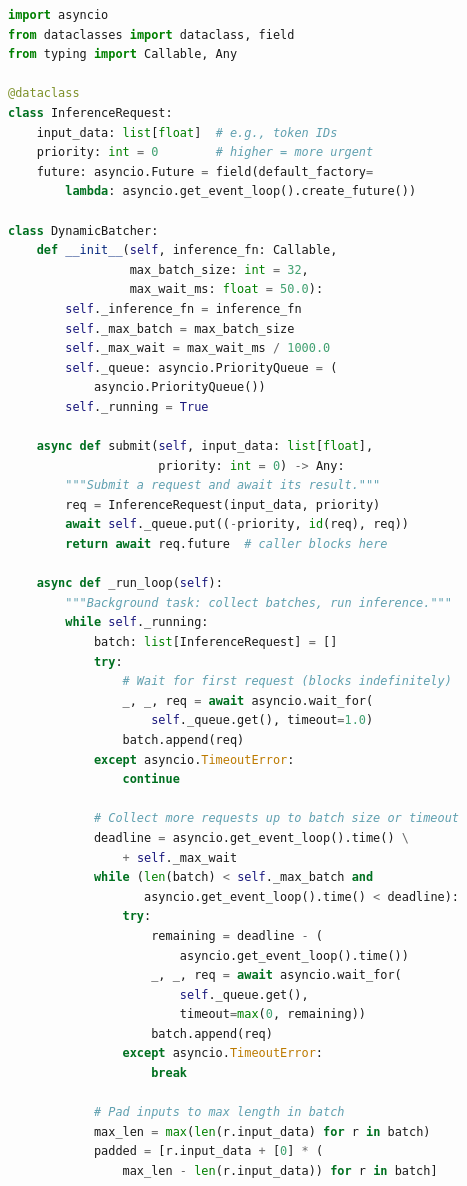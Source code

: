 \begin{lstlisting}[language=Python]
import asyncio
from dataclasses import dataclass, field
from typing import Callable, Any

@dataclass
class InferenceRequest:
    input_data: list[float]  # e.g., token IDs
    priority: int = 0        # higher = more urgent
    future: asyncio.Future = field(default_factory=
        lambda: asyncio.get_event_loop().create_future())

class DynamicBatcher:
    def __init__(self, inference_fn: Callable,
                 max_batch_size: int = 32,
                 max_wait_ms: float = 50.0):
        self._inference_fn = inference_fn
        self._max_batch = max_batch_size
        self._max_wait = max_wait_ms / 1000.0
        self._queue: asyncio.PriorityQueue = (
            asyncio.PriorityQueue())
        self._running = True

    async def submit(self, input_data: list[float],
                     priority: int = 0) -> Any:
        """Submit a request and await its result."""
        req = InferenceRequest(input_data, priority)
        await self._queue.put((-priority, id(req), req))
        return await req.future  # caller blocks here

    async def _run_loop(self):
        """Background task: collect batches, run inference."""
        while self._running:
            batch: list[InferenceRequest] = []
            try:
                # Wait for first request (blocks indefinitely)
                _, _, req = await asyncio.wait_for(
                    self._queue.get(), timeout=1.0)
                batch.append(req)
            except asyncio.TimeoutError:
                continue

            # Collect more requests up to batch size or timeout
            deadline = asyncio.get_event_loop().time() \
                + self._max_wait
            while (len(batch) < self._max_batch and
                   asyncio.get_event_loop().time() < deadline):
                try:
                    remaining = deadline - (
                        asyncio.get_event_loop().time())
                    _, _, req = await asyncio.wait_for(
                        self._queue.get(),
                        timeout=max(0, remaining))
                    batch.append(req)
                except asyncio.TimeoutError:
                    break

            # Pad inputs to max length in batch
            max_len = max(len(r.input_data) for r in batch)
            padded = [r.input_data + [0] * (
                max_len - len(r.input_data)) for r in batch]


\end{lstlisting}
